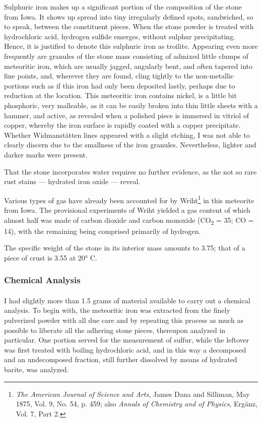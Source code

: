 \documentclass[a4paper, 12pt, oneside]{article}
\begin{document}
Sulphuric iron makes up a significant portion of the composition of the stone from Iowa. It shows up spread into tiny irregularly defined spots, sandwiched, so to speak, between the constituent pieces. When the stone powder is treated with hydrochloric acid, hydrogen sulfide emerges, without sulphur precipitating. Hence, it is justified to denote this sulphuric iron as troilite. Appearing even more frequently are granules of the stone mass consisting of admixed little clumps of meteoritic iron, which are usually jagged, angularly bent, and often tapered into fine points, and, wherever they are found, cling tightly to the non-metallic portions such as if this iron had only been deposited lastly, perhaps due to reduction at the location. This meteoritic iron contains nickel, is a little bit phosphoric, very malleable, as it can be easily broken into thin little sheets with a hammer, and active, as revealed when a polished piece is immersed in vitriol of copper, whereby the iron surface is rapidly coated with a copper precipitate. Whether Widmanstätten lines appeared with a slight etching, I was not able to clearly discern due to the smallness of the iron granules. Nevertheless, lighter and darker marks were present.

That the stone incorporates water requires no further evidence, as the not so rare rust stains --- hydrated iron oxide --- reveal.

Various types of gas have already been accounted for by Wriht\footnote{\emph{The American Journal of Science and Arts}, James Dana and Silliman, May 1875, Vol. 9, No. 54, p. 459; also \emph{Annals of Chemistry and of Physics}, Ergänz, Vol. 7, Part 2.} in this meteorite from Iowa. The provisional experiments of Wriht yielded a gas content of which almost half was made of carbon dioxide and carbon monoxide (CO\textsubscript{2} = 35; CO = 14), with the remaining being comprised primarily of hydrogen.

The specific weight of the stone in its interior mass amounts to 3.75; that of a piece of crust is 3.55 at 20° C.
\clearpage
\subsubsection{Chemical Analysis}
\paragraph*{}
I had slightly more than 1.5 grams of material available to carry out a chemical analysis. To begin with, the meteoritic iron was extracted from the finely pulverized powder with all due care and by repeating this process as much as possible to liberate all the adhering stone pieces, thereupon analyzed in particular. One portion served for the measurement of sulfur, while the leftover was first treated with boiling hydrochloric acid, and in this way a decomposed and an undecomposed fraction, still further dissolved by means of hydrated barite, was analyzed.
\end{document}
